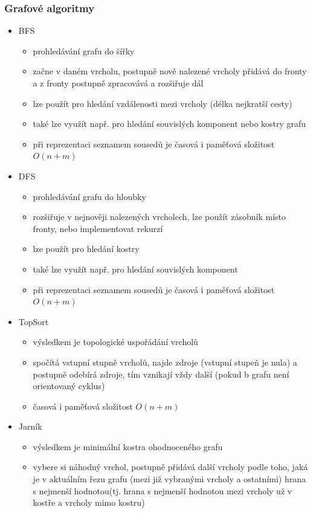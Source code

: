 \subsubsection*{Grafové algoritmy}
\begin{itemize}
	\item BFS
	\begin{itemize}
		\item prohledávání grafu do šířky
		\item začne v daném vrcholu, postupně nově nalezené vrcholy přidává do fronty a z fronty postupně zpracovává a rozšiřuje dál
		\item lze použít pro hledání vzdálenosti mezi vrcholy (délka nejkratší cesty)
		\item také lze využít např. pro hledání souvislých komponent nebo kostry grafu
		\item při reprezentaci seznamem sousedů je časová i paměťová složitost $O(n + m)$
	\end{itemize}
	\item DFS
	\begin{itemize}
		\item prohledávání grafu do hloubky
		\item rozšiřuje v nejnověji nalezených vrcholech, lze použít zásobník místo fronty, nebo implementovat rekurzí
		\item lze použít pro hledání kostry
		\item také lze využít např. pro hledání souvislých komponent
		\item při reprezentaci seznamem sousedů je časová i paměťová složitost $O(n + m)$
	\end{itemize}
	\item TopSort
	\begin{itemize}
		\item výsledkem je topologické uspořádání vrcholů
		\item spočítá vstupní stupně vrcholů, najde zdroje (vstupní stupeň je nula) a postupně odebírá zdroje, tím vznikají vždy další (pokud b grafu není orientovaný cyklus)
		\item časová i paměťová složitost $O(n + m)$
	\end{itemize}
	\item Jarník
	\begin{itemize}
		\item výsledkem je minimální kostra ohodnoceného grafu
		\item vybere si náhodný vrchol, postupně přidává další vrcholy podle toho, jaká je v aktuálním řezu grafu (mezi již vybranými vrcholy a ostatními) hrana s nejmenší hodnotou(tj. hrana s nejmenší hodnotou mezi vrcholy už v kostře a vrcholy mimo kostru)

\end{itemize}
\end{itemize}
